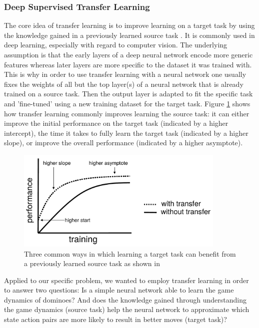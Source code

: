 \documentclass[12pt,a4paper]{article}
\begin{document}
{\subsubsection{Deep Supervised Transfer Learning}
The core idea of transfer learning is to improve learning on a target task by using the knowledge gained in a previously learned source task \citep{olivas_transfer_2010}. It is commonly used in deep learning, especially with regard to computer vision. The underlying assumption is that the early layers of a deep neural network encode more generic features whereas later layers are more specific to the dataset it was trained with. This is why in order to use transfer learning with a neural network one usually fixes the weights of all but the top layer(s) of a neural network that is already trained on a source task. Then the output layer is adapted to fit the specific task and 'fine-tuned' using a new training dataset for the target task. Figure \ref{fig:trnsfr_bttr} shows how transfer learning commonly improves learning the source task: it can either improve the initial performance on the target task (indicated by a higher intercept), the time it takes to fully learn the target task (indicated by a higher slope), or improve the overall performance (indicated by a higher asymptote).

\begin{figure}
  \includegraphics[width=10cm]{img/trnsfr_bttr.png}
  \centering 
  \caption{Three common ways in which learning a target task can benefit from a previously learned source task as shown in \citet{olivas_transfer_2010}}
  \label{fig:trnsfr_bttr}
\end{figure}

Applied to our specific problem, we wanted to employ transfer learning in order to answer two questions: Is a simple neural network able to learn the game dynamics of dominoes? And does the knowledge gained through understanding the game dynamics (source task) help the neural network to approximate which state action pairs are more likely to result in better moves (target task)?

}
\end{document}
